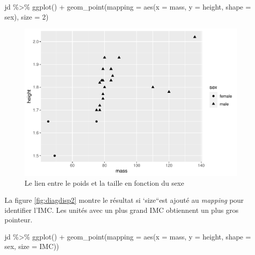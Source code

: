 \documentclass[
]{book}
\newenvironment{Shaded}{}{}
\newcommand{\AttributeTok}[1]{#1}
\newcommand{\DecValTok}[1]{#1}
\newcommand{\FunctionTok}[1]{#1}
\newcommand{\NormalTok}[1]{#1}
\newcommand{\SpecialCharTok}[1]{#1}
\begin{document}
\begin{Shaded}
\begin{Highlighting}[]
\NormalTok{jd }\SpecialCharTok{\%\textgreater{}\%} 
  \FunctionTok{ggplot}\NormalTok{() }\SpecialCharTok{+} 
  \FunctionTok{geom\_point}\NormalTok{(}\AttributeTok{mapping =} \FunctionTok{aes}\NormalTok{(}\AttributeTok{x =}\NormalTok{ mass, }\AttributeTok{y =}\NormalTok{ height, }\AttributeTok{shape =}\NormalTok{ sex), }\AttributeTok{size =} \DecValTok{2}\NormalTok{) }
\end{Highlighting}
\end{Shaded}

\begin{figure}

{\centering \includegraphics[width=0.75\linewidth,height=0.75\textheight]{07-Visualiser_files/figure-latex/diagdisp-1} 

}

\caption{Le lien entre le poids et la taille en fonction du sexe}\label{fig:diagdisp}
\end{figure}

La figure \ref{fig:diagdisp2} montre le résultat si `size``est ajouté au \emph{mapping} pour identifier l'IMC. Les unités avec un plus grand IMC obtiennent un plus gros pointeur.

\begin{Shaded}
\begin{Highlighting}[]
\NormalTok{jd }\SpecialCharTok{\%\textgreater{}\%} 
  \FunctionTok{ggplot}\NormalTok{() }\SpecialCharTok{+} 
  \FunctionTok{geom\_point}\NormalTok{(}\AttributeTok{mapping =} \FunctionTok{aes}\NormalTok{(}\AttributeTok{x =}\NormalTok{ mass, }\AttributeTok{y =}\NormalTok{ height, }\AttributeTok{shape =}\NormalTok{ sex, }\AttributeTok{size =}\NormalTok{ IMC)) }
\end{Highlighting}
\end{Shaded}
\end{document}
